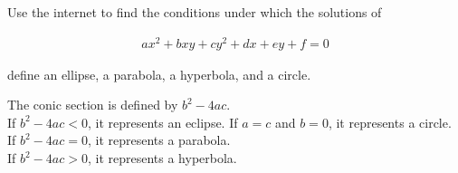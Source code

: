 Use the internet to find the conditions under which the solutions of

\begin{align*}
    ax^2 + bxy + cy^2 + dx + ey + f = 0
\end{align*}

define an ellipse, a parabola, a hyperbola, and a circle.

\begin{solution}
    The conic section is defined by $b^2 - 4ac$. \\
    If $b^2 - 4ac < 0$, it represents an eclipse. If $a=c$ and $b=0$, it represents a circle. \\
    If $b^2 - 4ac = 0$, it represents a parabola. \\
    If $b^2 - 4ac > 0$, it represents a hyperbola.
\end{solution}
